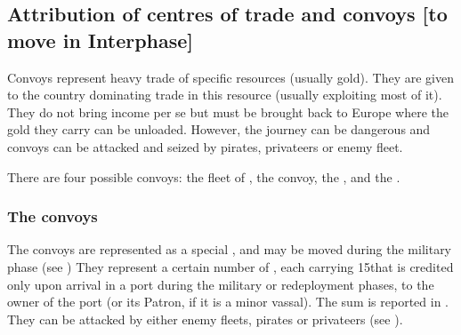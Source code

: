 \subsection{Attribution of centres of trade and convoys [to move in Interphase]}

\aparag Convoys represent heavy trade of specific resources (usually
gold). They are given to the country dominating trade in this resource
(usually exploiting most of it). They do not bring income per se but must be
brought back to Europe where the gold they carry can be unloaded. However, the
journey can be dangerous and convoys can be attacked and seized by pirates,
privateers or enemy fleet.

\aparag There are four possible convoys: the  fleet of
, the  convoy, the , and
the .


\subsubsection{The convoys}\label{chIncomes:Convoys}
\aparag The convoys are represented as a special \ND, and may be moved during
the military phase (see )
\bparag They represent a certain number of \NTD, each carrying 15\ducats that
is credited only upon arrival in a port during the military or redeployment
phases, to the owner of the port (or its Patron, if it is a minor vassal).
\bparag The sum is reported in .
\bparag They can be attacked by either enemy fleets, pirates or privateers
(see ).

